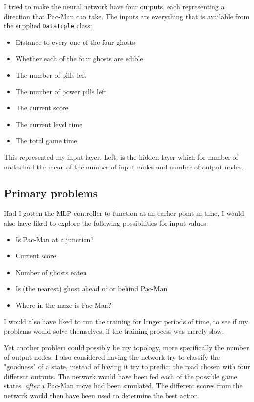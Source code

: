 I tried to make the neural network have four outputs, each representing a direction that Pac-Man can take. The inputs are everything that is available from the supplied \texttt{DataTuple} class:

\begin{itemize}
\item Distance to every one of the four ghosts
\item Whether each of the four ghosts are edible
\item The number of pills left
\item The number of power pills left
\item The current score
\item The current level time
\item The total game time
\end{itemize}

This represented my input layer. Left, is the hidden layer which for number of nodes had the mean of the number of input nodes and number of output nodes.

\subsection*{Primary problems}

Had I gotten the MLP controller to function at an earlier point in time, I would also have liked to explore the following possibilities for input values:

\begin{itemize}
\item Is Pac-Man at a junction?
\item Current score
\item Number of ghosts eaten
\item Is (the nearest) ghost ahead of or behind Pac-Man
\item Where in the maze is Pac-Man?
\end{itemize}

I would also have liked to run the training for longer periods of time, to see if my problems would solve themselves, if the training process was merely slow.

Yet another problem could possibly be my topology, more specifically the number of output nodes. I also considered having the network try to classify the "goodness" of a state, instead of having it try to predict the road chosen with four different outputs. The network would have been fed each of the possible game states, \emph{after} a Pac-Man move had been simulated. The different scores from the network would then have been used to determine the best action.